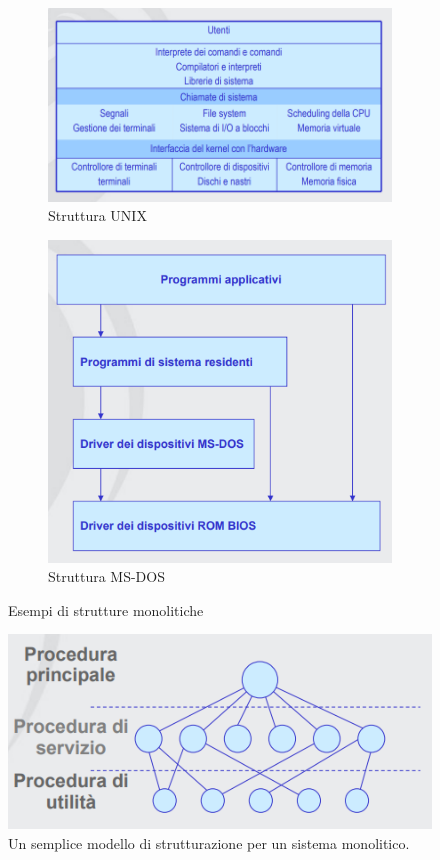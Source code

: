 \begin{figure}[!ht]
  \begin{subfigure}{.5\textwidth}
  \centering
    \includegraphics[width=1\linewidth]{assets/unix2.png}
    \caption{Struttura UNIX}
  \end{subfigure}%
  \begin{subfigure}{.5\textwidth}
  \centering
    \includegraphics[width=0.7\linewidth]{assets/msdos2.png}
    \caption{Struttura MS-DOS}
  \end{subfigure}
  \caption{Esempi di strutture monolitiche}
\end{figure}

\begin{figure}     
  \includegraphics[width=0.85\linewidth]{assets/monolitico2.png} 
  \caption{Un semplice modello di strutturazione per un sistema monolitico.}
\end{figure}

